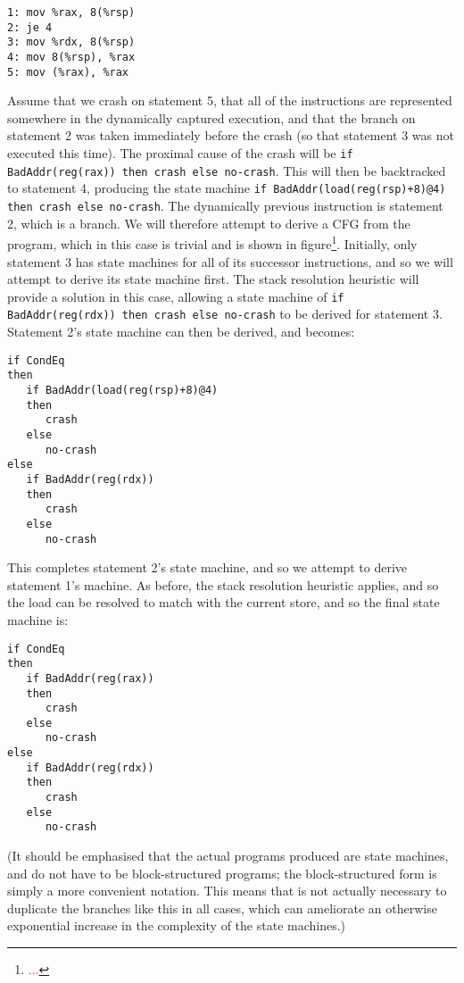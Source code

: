 \documentclass[10pt,twocolumn,preprint,natbib,authoryear]{sigplanconf}
\newcommand{\editorial}[1]{\textcolor{red}{\footnote{\textcolor{red}{#1}}}}
\begin{document}
\begin{verbatim}
1: mov %rax, 8(%rsp)
2: je 4
3: mov %rdx, 8(%rsp)
4: mov 8(%rsp), %rax
5: mov (%rax), %rax
\end{verbatim}

Assume that we crash on statement 5, that all of the instructions are
represented somewhere in the dynamically captured execution, and that
the branch on statement 2 was taken immediately before the crash (so
that statement 3 was not executed this time).  The proximal cause of
the crash will be
\verb|if BadAddr(reg(rax)) then crash else no-crash|.  This will then
be backtracked to statement 4, producing the state machine
\verb|if BadAddr(load(reg(rsp)+8)@4) then crash else no-crash|.  The
dynamically previous instruction is statement 2, which is a branch.
We will therefore attempt to derive a CFG from the program, which in
this case is trivial and is shown in figure\editorial{...}.
Initially, only statement 3 has state machines for all of its
successor instructions, and so we will attempt to derive its state
machine first.  The stack resolution heuristic will provide a solution
in this case, allowing a state machine of
\verb|if BadAddr(reg(rdx)) then crash else no-crash| to be derived
for statement 3.  Statement 2's state machine can then be derived,
and becomes:

\begin{verbatim}
if CondEq
then
   if BadAddr(load(reg(rsp)+8)@4)
   then
      crash
   else
      no-crash
else
   if BadAddr(reg(rdx))
   then
      crash
   else
      no-crash
\end{verbatim}

This completes statement 2's state machine, and so we attempt to
derive statement 1's machine.  As before, the stack resolution
heuristic applies, and so the load can be resolved to match with
the current store, and so the final state machine is:

\begin{verbatim}
if CondEq
then
   if BadAddr(reg(rax))
   then
      crash
   else
      no-crash
else
   if BadAddr(reg(rdx))
   then
      crash
   else
      no-crash
\end{verbatim}

(It should be emphasised that the actual programs produced are state
machines, and do not have to be block-structured programs; the
block-structured form is simply a more convenient notation.  This
means that is not actually necessary to duplicate the branches like
this in all cases, which can ameliorate an otherwise exponential
increase in the complexity of the state machines.)
\end{document}

